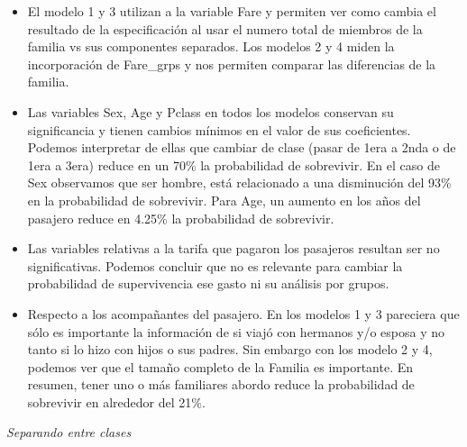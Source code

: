 \documentclass[
]{article}
\begin{document}
\begin{itemize}
\item
  El modelo 1 y 3 utilizan a la variable Fare y permiten ver como cambia
  el resultado de la especificación al usar el numero total de miembros
  de la familia vs sus componentes separados. Los modelos 2 y 4 miden la
  incorporación de Fare\_grps y nos permiten comparar las diferencias de
  la familia.
\item
  Las variables Sex, Age y Pclass en todos los modelos conservan su
  significancia y tienen cambios mínimos en el valor de sus
  coeficientes. Podemos interpretar de ellas que cambiar de clase (pasar
  de 1era a 2nda o de 1era a 3era) reduce en un 70\% la probabilidad de
  sobrevivir. En el caso de Sex observamos que ser hombre, está
  relacionado a una disminución del 93\% en la probabilidad de
  sobrevivir. Para Age, un aumento en los años del pasajero reduce en
  4.25\% la probabilidad de sobrevivir.
\item
  Las variables relativas a la tarifa que pagaron los pasajeros resultan
  ser no significativas. Podemos concluir que no es relevante para
  cambiar la probabilidad de supervivencia ese gasto ni su análisis por
  grupos.
\item
  Respecto a los acompañantes del pasajero. En los modelos 1 y 3
  pareciera que sólo es importante la información de si viajó con
  hermanos y/o esposa y no tanto si lo hizo con hijos o sus padres. Sin
  embargo con los modelo 2 y 4, podemos ver que el tamaño completo de la
  Familia es importante. En resumen, tener uno o más familiares abordo
  reduce la probabilidad de sobrevivir en alrededor del 21\%.
\end{itemize}

\emph{Separando entre clases}
\end{document}
